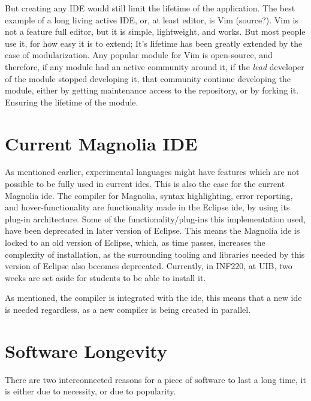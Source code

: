 But creating any IDE would still limit the lifetime of the application. The best
example of a long living active IDE, or, at least editor, is Vim (source?). Vim
is not a feature full editor, but it is simple, lightweight, and works. But most
people use it, for how easy it is to extend; It's lifetime has been greatly
extended by the ease of modularization. Any popular module for Vim is
open-source, and therefore, if any module had an active community around it, if
the \textit{lead} developer of the module stopped developing it, that community
continue developing the module, either by getting maintenance access to the
repository, or by forking it. Ensuring the lifetime of the module.

\section{Current Magnolia IDE}

As mentioned earlier, experimental languages might have features which are not
possible to be fully used in current \gls{ide}s. This is also the case for the
current Magnolia \gls{ide}. The compiler for Magnolia, syntax highlighting,
error reporting, and hover-functionality are functionality made in the Eclipse
\gls{ide}, by using its plug-in architecture. Some of the functionality/plug-ins
this implementation used, have been deprecated in later version of Eclipse. This
means the Magnolia \gls{ide} is locked to an old version of Eclipse, which, as
time passes, increases the complexity of installation, as the surrounding
tooling and libraries needed by this version of Eclipse also becomes deprecated.
Currently, in INF220, at UIB, two weeks are set aside for students to be able to
install it.


As mentioned, the compiler is integrated with the \gls{ide}, this means that a
new \gls{ide} is needed regardless, as a new compiler is being created in
parallel.

\section{Software Longevity}

There are two interconnected reasons for a piece of software to last a long
time, it is either due to necessity, or due to popularity.

